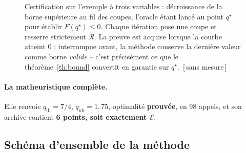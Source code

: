\documentclass[11pt,a4paper]{article}
\theoremstyle{plain}
\theoremstyle{remark}
\newcommand{\Ecal}{\mathcal{E}}
\newcommand{\Rcal}{\mathcal{R}}
\newcommand{\qs}{q^{\star}}
\newcommand{\confna}{\textsf{\footnotesize[\,sans mesure\,]}}
\begin{document}
\begin{figure}[H]
\centering
{}
\caption{Certification sur l'exemple à trois variables : décroissance de la
borne supérieure au fil des coupes, l'oracle étant lancé au point $\qs$ pour
établir $F(\qs)\le 0$. Chaque itération pose une coupe et resserre
strictement $\Rcal$. La preuve est acquise lorsque la courbe atteint $0$ ;
interrompue avant, la méthode conserve la dernière valeur comme borne
\emph{valide} -- c'est précisément ce que le théorème~\ref{th:bound}
convertit en garantie sur $\qs$.\ \confna}
\label{fig:ex3anytime}
\end{figure}

\paragraph{La matheuristique complète.} Elle renvoie $q_{\text{lb}}=7/4$,
$q_{\text{ub}}=1{,}75$, optimalité \textbf{prouvée}, en 98 appels, et son
archive contient \textbf{6 points, soit exactement $\Ecal$}.

\subsection{Schéma d'ensemble de la méthode}
\end{document}
